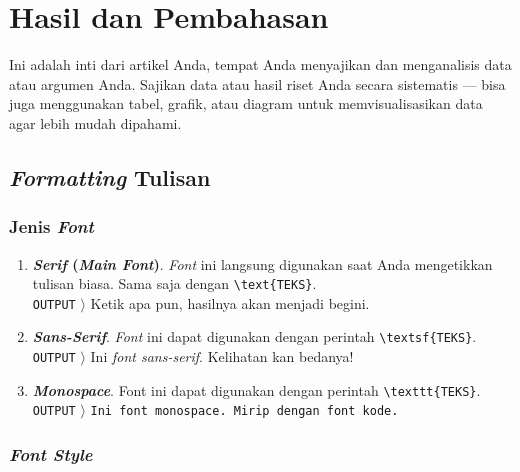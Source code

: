 \section{Hasil dan Pembahasan}


Ini adalah inti dari artikel Anda, tempat Anda menyajikan dan menganalisis data atau argumen Anda. Sajikan data atau hasil riset Anda secara sistematis --- bisa juga menggunakan tabel, grafik, atau diagram untuk memvisualisasikan data agar lebih mudah dipahami.

\subsection{\textit{Formatting} Tulisan}

\subsubsection{Jenis \textit{Font}}

\begin{enumerate}[label=\alph*.]
    \item \textbf{\textit{Serif} (\textit{Main Font})}. \textit{Font} ini langsung digunakan saat Anda mengetikkan tulisan biasa. Sama saja dengan \verb|\text{TEKS}|. \\
    \texttt{OUTPUT} $\rangle$ Ketik apa pun, hasilnya akan menjadi begini.
    \item \textbf{\textit{Sans-Serif}}. \textit{Font} ini dapat digunakan dengan perintah \verb|\textsf{TEKS}|. \\
    \texttt{OUTPUT} $\rangle$ \textsf{Ini \textit{font sans-serif}. Kelihatan kan bedanya!}
    \item \textbf{\textit{Monospace}}. Font ini dapat digunakan dengan perintah \verb|\texttt{TEKS}|. \\
    \texttt{OUTPUT} $\rangle$ \texttt{Ini font monospace. Mirip dengan font kode.}
\end{enumerate}

\subsubsection{\textit{Font Style}}

